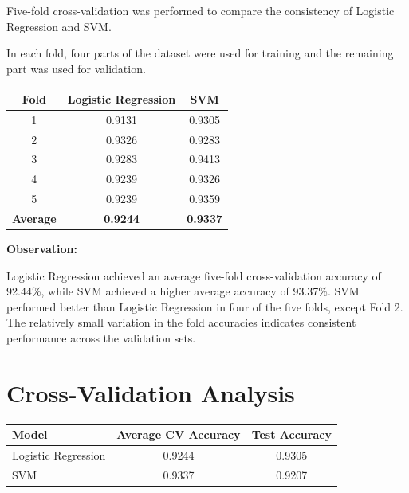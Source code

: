 \documentclass[12pt,a4paper]{article}
\begin{document}
Five-fold cross-validation was performed to compare the consistency
of Logistic Regression and SVM.

In each fold, four parts of the dataset were used for training and the
remaining part was used for validation.

\begin{longtable}{|c|c|c|}
\hline
\textbf{Fold} &
\textbf{Logistic Regression} &
\textbf{SVM}
\\ \hline

1 & 0.9131 & 0.9305 \\ \hline

2 & 0.9326 & 0.9283 \\ \hline

3 & 0.9283 & 0.9413 \\ \hline

4 & 0.9239 & 0.9326 \\ \hline

5 & 0.9239 & 0.9359 \\ \hline

\textbf{Average} & \textbf{0.9244} & \textbf{0.9337} \\ \hline

\end{longtable}

\textbf{Observation:}

Logistic Regression achieved an average five-fold cross-validation
accuracy of 92.44\%, while SVM achieved a higher average accuracy of
93.37\%. SVM performed better than Logistic Regression in four of the
five folds, except Fold 2. The relatively small variation in the fold
accuracies indicates consistent performance across the validation
sets.


\section{Cross-Validation Analysis}

\begin{longtable}{|p{6cm}|c|c|}
\hline
\textbf{Model} &
\textbf{Average CV Accuracy} &
\textbf{Test Accuracy}
\\ \hline

Logistic Regression &
0.9244 &
0.9305
\\ \hline

SVM &
0.9337 &
0.9207
\\ \hline

\end{longtable}
\end{document}
